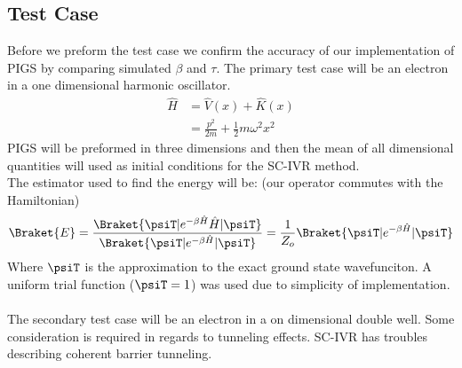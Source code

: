\subsection*{Test Case}
Before we preform the test case we confirm the accuracy of our implementation of PIGS by comparing simulated $\beta$ and $\tau$.
The primary test case will be an electron in a one dimensional harmonic oscillator. 
\begin{align}
	\hat{H} &= \hat{V}(x) + \hat{K}(x) \\
			&= \frac{p^2}{2m} + \frac{1}{2} m \omega^{2} x^{2} 
\end{align}
PIGS will be preformed in three dimensions and then the mean of all dimensional quantities will used as initial conditions for the SC-IVR method. \\
The estimator used to find the energy will be: (our operator commutes with the Hamiltonian)
\begin{equation}
	\Braket{E} = \frac{\Braket{\psiT|e^{-\beta\hat{H}}\hat{H}|\psiT}}{\Braket{\psiT|e^{-\beta\hat{H}}|\psiT}} = \frac{1}{Z_{o}} \Braket{\psiT|e^{-\beta\hat{H}}|\psiT}
\end{equation}
Where $\psiT$ is the approximation to the exact ground state wavefunciton. A uniform trial function ($\psiT = 1$) was used due to simplicity of implementation.
\\ \\
The secondary test case will be an electron in a on dimensional double well. Some consideration is required in regards to tunneling effects. SC-IVR has troubles describing coherent barrier tunneling.

